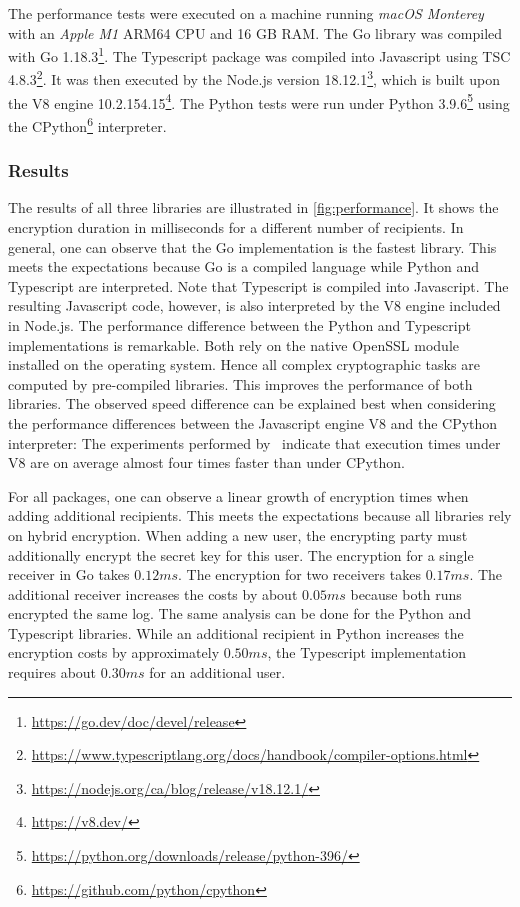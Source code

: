 \documentclass[../main.tex]{subfiles}
\begin{document}
The performance tests were executed on a machine running \emph{macOS Monterey} with an \emph{Apple M1} ARM64 CPU and 16 GB RAM.
The Go library was compiled with Go 1.18.3\footnote{\url{https://go.dev/doc/devel/release}}.
The Typescript package was compiled into Javascript using TSC 4.8.3\footnote{\url{https://www.typescriptlang.org/docs/handbook/compiler-options.html}}. 
It was then executed by the Node.js version 18.12.1\footnote{\url{https://nodejs.org/ca/blog/release/v18.12.1/}}, which is built upon the V8 engine 10.2.154.15\footnote{\url{https://v8.dev/}}.
The Python tests were run under Python 3.9.6\footnote{\url{https://python.org/downloads/release/python-396/}} using the CPython\footnote{\url{https://github.com/python/cpython}} interpreter.

\subsubsection{Results}
The results of all three libraries are illustrated in \cref{fig:performance}.
It shows the encryption duration in milliseconds for a different number of recipients.
In general, one can observe that the Go implementation is the fastest library.
This meets the expectations because Go is a compiled language while Python and Typescript are interpreted.
Note that Typescript is compiled into Javascript.
The resulting Javascript code, however, is also interpreted by the V8 engine included in Node.js.
The performance difference between the Python and Typescript implementations is remarkable.
Both rely on the native OpenSSL module installed on the operating system.
Hence all complex cryptographic tasks are computed by pre-compiled libraries.
This improves the performance of both libraries.
The observed speed difference can be explained best when considering the performance differences between the Javascript engine V8 and the CPython interpreter:
The experiments performed by~\cite{Lion2022} indicate that execution times under V8 are on average almost four times faster than under CPython.

For all packages, one can observe a linear growth of encryption times when adding additional recipients.
This meets the expectations because all libraries rely on hybrid encryption.
When adding a new user, the encrypting party must additionally encrypt the secret key for this user.
The encryption for a single receiver in Go takes $0.12ms$.
The encryption for two receivers takes $0.17ms$.
The additional receiver increases the costs by about $0.05ms$ because both runs encrypted the same log.
The same analysis can be done for the Python and Typescript libraries.
While an additional recipient in Python increases the encryption costs by approximately $0.50ms$, the Typescript implementation requires about $0.30ms$ for an additional user.
\end{document}
